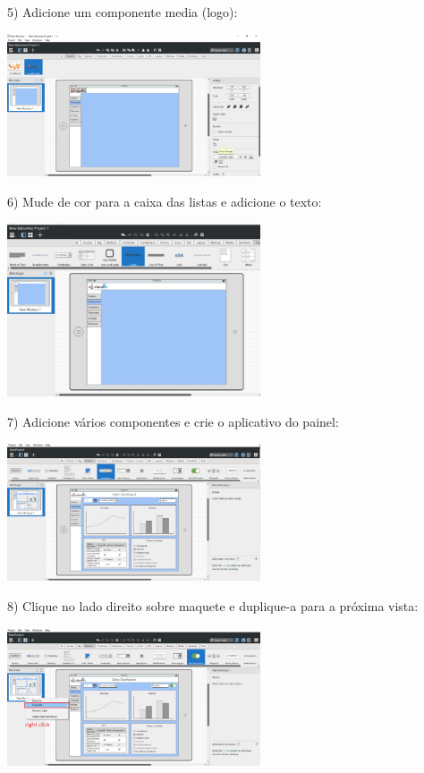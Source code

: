 \documentclass{tufte-book} %
\begin{document}
5) Adicione um componente media (logo):

\begin{center}
	\includegraphics[width=7.50cm]{img15.png}
\end{center}

\break

6) Mude de cor para a caixa das listas e adicione o texto:

\begin{center}
	\includegraphics[width=7.50cm]{img16.png}
\end{center}

7) Adicione vários componentes e crie o aplicativo do painel:

\begin{center}
	\includegraphics[width=7.50cm]{img17.png}
\end{center}

8) Clique no lado direito sobre maquete e duplique-a para a próxima vista:

\begin{center}
	\includegraphics[width=7.50cm]{img18.png}
\end{center}
\end{document}
